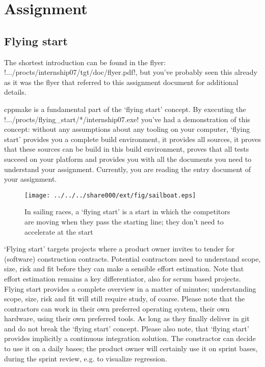\chapter{Assignment}
\label{sec:internship01.assignment}
\section{Flying start}
\label{sec:internship01.assignment.flyingstart}
The shortest introduction can be found in the flyer:
!.../procts/internship07/tgt/doc/flyer.pdf!,
but you've probably seen this already as it was the flyer that referred to this
assignment document for additional details.

cppmake is a fundamental part of the `flying start' concept. By executing the
!.../procts/flying_start/*/internship07.exe! you've had a demonstration of this
concept: without any assumptions about any tooling on your computer, `flying
start' provides you a complete build environment, it provides all sources, it
proves that these sources can be build in this build environment, proves that
all tests succeed on your platform and provides you with all the documents
you need to understand your assignment. Currently, you are reading the entry
document of your assignment.

\begin{figure}[htb]
    \begin{center}
        \texttt{[image: ../../../share000/ext/fig/sailboat.eps]}
    \end{center}
    \caption{In sailing races, a `flying start' is a start in which the 
	         competitors are moving when they pass the starting line; they don't
			 need to accelerate at the start}
\end{figure}

`Flying start' targets projects where a product owner invites to tender for 
(software) construction contracts. Potential contractors need to understand
scope, size, risk and fit before they can make a sensible effort estimation.
Note that effort estimation remains a key differentiator, also for scrum
based projects. Flying start provides a complete overview in a matter of
minutes; understanding scope, size, risk and fit will still require study,
of coarse. Please note that the contractors can work in their own preferred
operating system, their own hardware, using their own preferred tools. As
long as they finally deliver in git and do not break the `flying start'
concept. Please also note, that `flying start' provides implicitly a
continuous integration solution. The constractor can decide to use it on
a daily bases; the product owner will certainly use it on sprint bases,
during the sprint review, e.g. to visualize regression.

